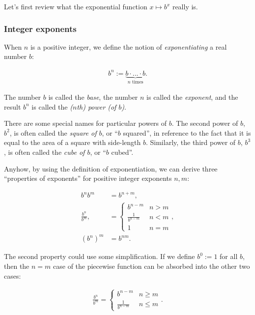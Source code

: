 Let's first review what the exponential function $x \mapsto b^x$ really is. 

\subsubsection*{Integer exponents}

When $n$ is a positive integer, we define the notion of \textit{exponentiating} a real number $b$:

\begin{align*}
    b^n := \underbrace{b \cdot ... \cdot b}_{\text{$n$ times}}.
\end{align*}

The number $b$ is called the \textit{base}, the number $n$ is called the \textit{exponent}, and the result $b^n$ is called the \textit{($n$th) power (of $b$)}.

There are some special names for particular powers of $b$. The second power of $b$, $b^2$, is often called the \textit{square of $b$}, or ``$b$ squared'', in reference to the fact that it is equal to the area of a square with side-length $b$. Similarly, the third power of $b$, $b^3$, is often called the \textit{cube of $b$}, or ``$b$ cubed''. 

Anyhow, by using the definition of exponentiation, we can derive three ``properties of exponents'' for positive integer exponents $n, m$:

\begin{align*}
    b^n b^m &= b^{n + m}, \\
    \frac{b^n}{b^m}, &=
    \begin{cases}
        b^{n - m} & n > m \\
        \frac{1}{b^{n - m}} & n < m \\
        1 & n = m
    \end{cases}, \\
    (b^n)^m &= b^{nm}.
\end{align*}

The second property could use some simplification. If we define $b^0 := 1$ for all $b$, then the $n = m$ case of the piecewise function can be absorbed into the other two cases:

\begin{align*}
    \frac{b^n}{b^m} =
    \begin{cases}
        b^{n - m} & n \geq m \\
        \frac{1}{b^{n - m}} & n \leq m
    \end{cases}.
\end{align*}

